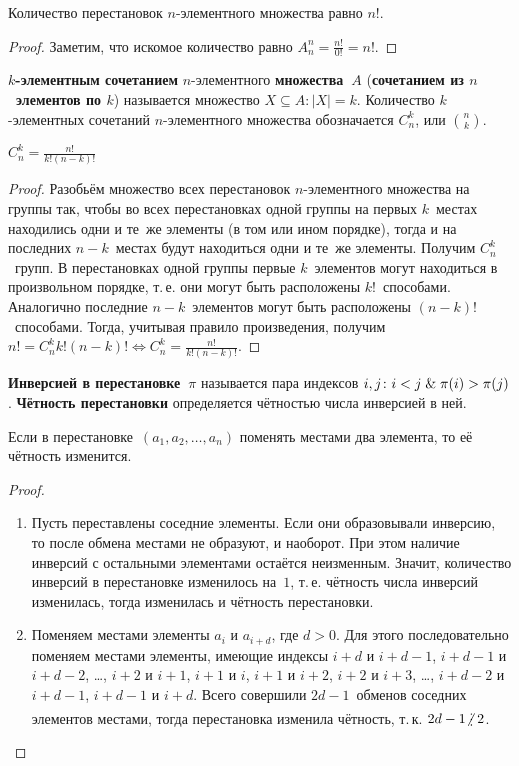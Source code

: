 \begin{consequent}
Количество перестановок $n$-элементного множества равно $n!$.
\end{consequent}
\begin{proof}
Заметим, что искомое количество равно $A_n^n = \frac{n!}{0!} = n!$.
\end{proof}

 \textbf{$k$-элементным сочетанием} $n$-элементного \textbf{множества~$A$} (\textbf{сочетанием из $n$~элементов по $k$}) называется множество $X \subseteq A \colon |X| = k$.
Количество $k$-элементных сочетаний $n$-элементного множества обозначается $C_n^k$, или $\binom{n}{k}$.

\begin{statement}
$C_n^k = \frac{n!}{k! (n - k)!}$
\end{statement}
\begin{proof}
Разобьём множество всех перестановок $n$-элементного множества на группы так, чтобы во всех перестановках одной группы на первых $k$~местах находились одни и те~же элементы (в том или ином порядке), тогда и на последних $n - k$~местах будут находиться одни и те~же элементы.
Получим $C_n^k$~групп.
В перестановках одной группы первые $k$~элементов могут находиться в произвольном порядке, т.\,е. они могут быть расположены $k!$~способами.
Аналогично последние $n - k$~элементов могут быть расположены $(n - k)!$~способами.
Тогда, учитывая правило произведения, получим $n! = C_n^k k! (n - k)! \Leftrightarrow C_n^k = \frac{n!}{k! (n - k)!}$.
\end{proof}

 \textbf{Инверсией в перестановке~$\pi$} называется пара индексов $i, j \colon i < j \mathrel{\&} \pi(i) > \pi(j)$.
\textbf{Чётность перестановки} определяется чётностью числа инверсией в ней.

\begin{statement}
\label{st:parity_of_permutation}
Если в перестановке~$(a_1, a_2, \ldots, a_n)$ поменять местами два элемента, то её чётность изменится.
\end{statement}
\begin{proof}
\begin{enumerate}
	\item Пусть переставлены соседние элементы.
	Если они образовывали инверсию, то после обмена местами не образуют, и наоборот.
	При этом наличие инверсий с остальными элементами остаётся неизменным.
	Значит, количество инверсий в перестановке изменилось на~$1$, т.\,е. чётность числа инверсий изменилась, тогда изменилась и чётность перестановки.
	
	\item Поменяем местами элементы $a_i$ и $a_{i+d}$, где $d > 0$.
	Для этого последовательно поменяем местами элементы, имеющие индексы $i+d$ и $i+d-1$, $i+d-1$ и $i+d-2$, \ldots, $i+2$ и $i+1$, $i+1$ и $i$, $i+1$ и $i+2$, $i+2$ и $i+3$, \ldots, $i+d-2$ и $i+d-1$, $i+d-1$ и $i+d$.
	Всего совершили $2d - 1$~обменов соседних элементов местами, тогда перестановка изменила чётность, т.\,к. $2d - 1 \notmult 2$.
\end{enumerate}
\end{proof}